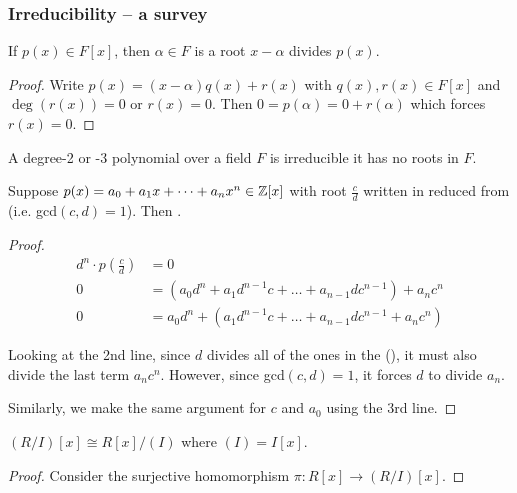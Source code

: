 \documentclass[12pt]{article}
\begin{document}
    \subsubsection{Irreducibility -- a survey}
    \begin{proposition}
        If $p(x)\in F[x]$, then $\alpha\in F$ is a root \ifnif $x-\alpha$ divides $p(x)$.
    \end{proposition}
    \begin{proof}
        Write $p(x)=(x-\alpha)q(x)+r(x)$ with $q(x),r(x)\in F[x]$ and $\deg (r(x))=0$ or $r(x)=0$. Then $0=p(\alpha)=0+r(\alpha)$ which forces $r(x)=0$.
    \end{proof}

    \begin{corollary}
        A degree-2 or -3 polynomial over a field $F$ is irreducible \ifnif it has no roots in $F$.
    \end{corollary}

    \begin{proposition}
        Suppose $p(x)=a_0+a_1x+\dots + a_nx^n\in \mathbb{Z}[x]$ with root $\frac{c}{d}$ written in reduced from (i.e. gcd$(c,d)=1$). Then .
    \end{proposition}
    \begin{proof}
        \begin{align*}
            d^n \cdot p\left(\frac{c}{d}\right) &=0\\
            0&= (a_0d^n + a_1 d^{n-1} c+ \dots +a_{n-1}dc^{n-1}) + a_nc^n\\
            0&= a_0d^n + (a_1 d^{n-1} c+ \dots +a_{n-1}dc^{n-1} + a_nc^n)
        \end{align*}

        Looking at the 2nd line, since $d$ divides all of the ones in the (), it must also divide the last term $a_nc^n$. However, since gcd$(c,d)=1$, it forces $d$ to divide $a_n$.

        Similarly, we make the same argument for $c$ and $a_0$ using the 3rd line.
    \end{proof}

    \begin{lemma}
        $(R/I)[x]\cong R[x]/(I)$ where $(I)=I[x]$.
    \end{lemma}
    \begin{proof}
        Consider the surjective homomorphism $\pi: R[x]\to (R/I)[x]$.
    \end{proof}
\end{document}
